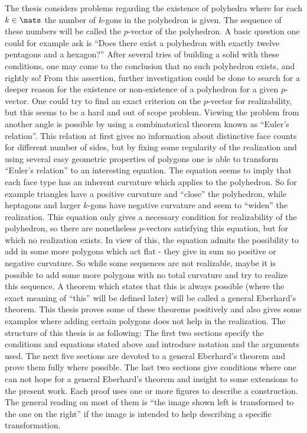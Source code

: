 The thesis considers problems regarding the existence of polyhedra where for each $k \in \nats$ the number of $k$-gons in the polyhedron is given. The sequence of these numbers will be called the $p$-vector of the polyhedron. A basic question one could for example ask is ``Does there exist a polyhedron with exactly twelve pentagons and a hexagon?'' After several tries of building a solid with these conditions, one may come to the conclusion that no such polyhedron exists, and rightly so! From this assertion, further investigation could be done to search for a deeper reason for the existence or non-existence of a polyhedron for a given $p$-vector. One could try to find an exact criterion on the $p$-vector for realizability, but this seems to be a hard and out of scope problem. Viewing the problem from another angle is possible by using a combinatorical theorem known as ``Euler's relation''. This relation at first gives no information about distinctive face counts for different number of sides, but by fixing some regularity of the realization and using several easy geometric properties of polygons one is able to transform ``Euler's relation'' to an interesting equation. The equation seems to imply that each face type has an inherent curvature which applies to the polyhedron. So for example triangles have a positive curvature and ``close'' the polyhedron, while heptagons and larger $k$-gons have negative curvature and seem to ``widen'' the realization. This equation only gives a necessary condition for realizability of the polyhedron, so there are nonetheless $p$-vectors satisfying this equation, but for which no realization exists. In view of this, the equation admits the possibility to add in some more polygons which act flat - they give in sum no positive or negative curvature. So while some sequences are not realizable, maybe it is possible to add some more polygons with no total curvature and try to realize this sequence. A theorem which states that this is always possible (where the exact meaning of ``this'' will be defined later) will be called a general Eberhard's theorem. This thesis proves some of these theorems positively and also gives some examples where adding certain polygons does not help in the realization. The structure of this thesis is as following: The first two sections specify the conditions and equations stated above and introduce notation and the arguments used. The next five sections are devoted to a general Eberhard's theorem and prove them fully where possible. The last two sections give conditions where one can not hope for a general Eberhard's theorem and insight to some extensions to the present work. Each proof uses one or more figures to describe a construction. The general reading on most of them is ``the image shown left is transformed to the one on the right'' if the image is intended to help describing a specific transformation.

